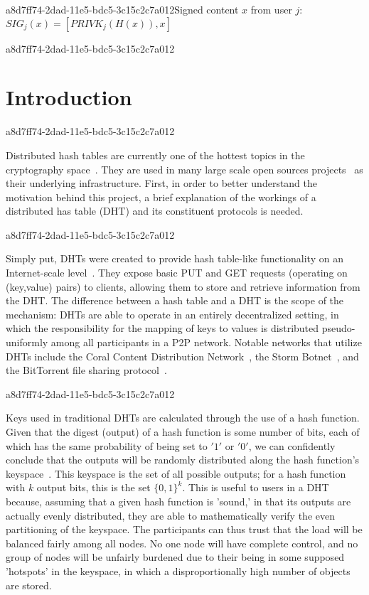 \documentclass[12pt]{article}
\begin{document}
a8d7ff74-2dad-11e5-bdc5-3c15c2c7a012Signed content $x$ from user $j$: $SIG_j(x) = \left[ PRIVK_j( H(x) ), x \right]$

a8d7ff74-2dad-11e5-bdc5-3c15c2c7a012\section{Introduction}
a8d7ff74-2dad-11e5-bdc5-3c15c2c7a012\par Distributed hash tables are currently one of the hottest topics in the cryptography space~\cite{Stoica:2001dj,Rowstron:2001ea,Ratnasamy:2001wn}. They are used in many large scale open sources projects~\cite{Freitas:2013tb,Xu:2010vs,Perfitt:2010fh} as their underlying infrastructure. First, in order to better understand the motivation behind this project, a brief explanation of the workings of a distributed has table (DHT) and its constituent protocols is needed.

a8d7ff74-2dad-11e5-bdc5-3c15c2c7a012\par Simply put, DHTs were created to provide hash table-like functionality on an Internet-scale level~\cite{Ratnasamy:2001wn}. They expose basic PUT and GET requests (operating on (key,value) pairs) to clients, allowing them to store and retrieve information from the DHT. The difference between a hash table and a DHT is the scope of the mechanism: DHTs are able to operate in an entirely decentralized setting, in which the responsibility for the mapping of keys to values is distributed pseudo-uniformly among all participants in a P2P network. Notable networks that utilize DHTs include the Coral Content Distribution Network~\cite{Freedman:2004vb}, the Storm Botnet~\cite{Holz:2008uk}, and the BitTorrent file sharing protocol~\cite{Cohen:y1_8mBnw}.

a8d7ff74-2dad-11e5-bdc5-3c15c2c7a012\par Keys used in traditional DHTs are calculated through the use of a hash function. Given that the digest (output) of a hash function is some number of bits, each of which has the same probability of being set to $'1'$ or $'0'$, we can confidently conclude that the outputs will be randomly distributed along the hash function's keyspace~. This keyspace is the set of all possible outputs; for a hash function with $k$ output bits, this is the set $\{0,1\}^k$. This is useful to users in a DHT because, assuming that a given hash function is 'sound,' in that its outputs are actually evenly distributed, they are able to mathematically verify the even partitioning of the keyspace. The participants can thus trust that the load will be balanced fairly among all nodes. No one node will have complete control, and no group of nodes will be unfairly burdened due to their being in some supposed 'hotspots' in the keyspace, in which a disproportionally high number of objects are stored.~
\end{document}
